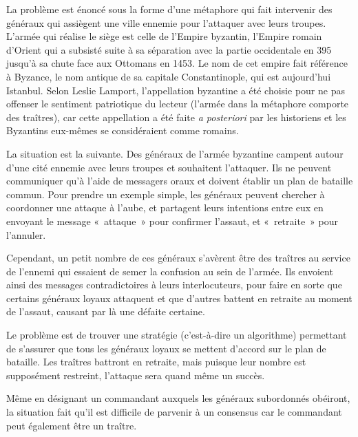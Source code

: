 La problème est énoncé sous la forme d'une métaphore qui fait intervenir des généraux qui assiègent une ville ennemie pour l'attaquer avec leurs troupes. L'armée qui réalise le siège est celle de l'Empire byzantin, l'Empire romain d'Orient qui a subsisté suite à sa séparation avec la partie occidentale en 395 jusqu'à sa chute face aux Ottomans en 1453. Le nom de cet empire fait référence à Byzance, le nom antique de sa capitale Constantinople, qui est aujourd'hui Istanbul. Selon Leslie Lamport, l'appellation byzantine a été choisie pour ne pas offenser le sentiment patriotique du lecteur (l'armée dans la métaphore comporte des traîtres), car cette appellation a été faite \emph{a posteriori} par les historiens et les Byzantins eux-mêmes se considéraient comme romains.

La situation est la suivante. Des généraux de l'armée byzantine campent autour d'une cité ennemie avec leurs troupes et souhaitent l'attaquer. Ils ne peuvent communiquer qu'à l'aide de messagers oraux et doivent établir un plan de bataille commun. Pour prendre un exemple simple, les généraux peuvent chercher à coordonner une attaque à l'aube, et partagent leurs intentions entre eux en envoyant le message «~attaque~» pour confirmer l'assaut, et «~retraite~» pour l'annuler.

Cependant, un petit nombre de ces généraux s'avèrent être des traîtres au service de l'ennemi qui essaient de semer la confusion au sein de l'armée. Ils envoient ainsi des messages contradictoires à leurs interlocuteurs, pour faire en sorte que certains généraux loyaux attaquent et que d'autres battent en retraite au moment de l'assaut, causant par là une défaite certaine.

Le problème est de trouver une stratégie (c'est-à-dire un algorithme) permettant de s'assurer que tous les généraux loyaux se mettent d'accord sur le plan de bataille. Les traîtres battront en retraite, mais puisque leur nombre est supposément restreint, l'attaque sera quand même un succès.

Même en désignant un commandant auxquels les généraux subordonnés obéiront, la situation fait qu'il est difficile de parvenir à un consensus car le commandant peut également être un traître.


